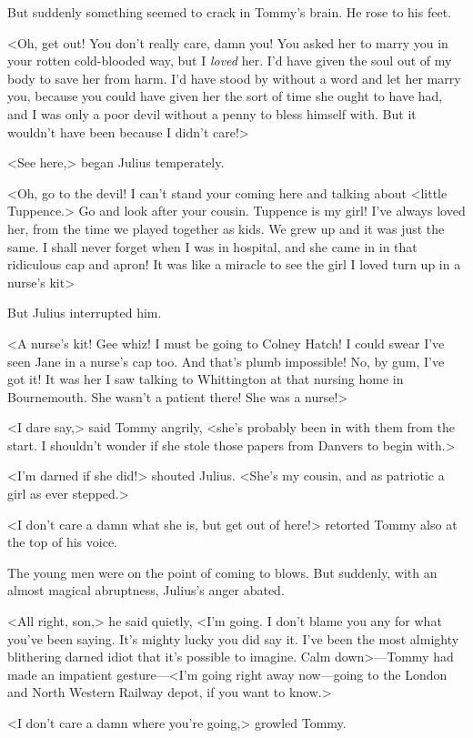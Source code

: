 But suddenly something seemed to crack in Tommy's brain. He rose to his feet.

<Oh, get out! You don't really care, damn you! You asked her to marry you in your rotten cold-blooded way, but I \emph{loved} her. I'd have given the soul out of my body to save her from harm. I'd have stood by without a word and let her marry you, because you could have given her the sort of time she ought to have had, and I was only a poor devil without a penny to bless himself with. But it wouldn't have been because I didn't care!>

<See here,> began Julius temperately.

<Oh, go to the devil! I can't stand your coming here and talking about <little Tuppence.> Go and look after your cousin. Tuppence is my girl! I've always loved her, from the time we played together as kids. We grew up and it was just the same. I shall never forget when I was in hospital, and she came in in that ridiculous cap and apron! It was like a miracle to see the girl I loved turn up in a nurse's kit\longdash>

But Julius interrupted him.

<A nurse's kit! Gee whiz! I must be going to Colney Hatch! I could swear I've seen Jane in a nurse's cap too. And that's plumb impossible! No, by gum, I've got it! It was her I saw talking to Whittington at that nursing home in Bournemouth. She wasn't a patient there! She was a nurse!>

<I dare say,> said Tommy angrily, <she's probably been in with them from the start. I shouldn't wonder if she stole those papers from Danvers to begin with.>

<I'm darned if she did!> shouted Julius. <She's my cousin, and as patriotic a girl as ever stepped.>

<I don't care a damn what she is, but get out of here!> retorted Tommy also at the top of his voice.

The young men were on the point of coming to blows. But suddenly, with an almost magical abruptness, Julius's anger abated.

<All right, son,> he said quietly, <I'm going. I don't blame you any for what you've been saying. It's mighty lucky you did say it. I've been the most almighty blithering darned idiot that it's possible to imagine. Calm down>—Tommy had made an impatient gesture—<I'm going right away now—going to the London and North Western Railway depot, if you want to know.>

<I don't care a damn where you're going,> growled Tommy.

